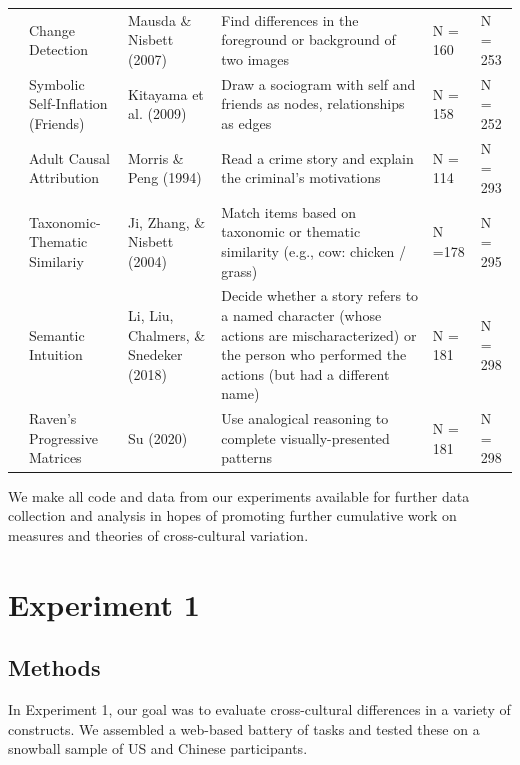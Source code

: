 \documentclass[
  man,floatsintext]{apa6}
\begin{document}
\begin{table}[H]
{\begin{tabular}{l p{1.5in} p{1.5in} p{1.5in} p{.5in} p{.5in}}
& Change Detection & Mausda \& Nisbett (2007) & Find differences in the foreground or background of two images & N = 160 & N = 253\\

& Symbolic Self-Inflation (Friends) & Kitayama et al. (2009) & Draw a sociogram with self and friends as nodes, relationships as edges & N = 158 & N = 252\\

& Adult Causal Attribution & Morris \& Peng (1994) & Read a crime story and explain the criminal’s motivations & N = 114 & N = 293\\

& Taxonomic-Thematic Similariy & Ji, Zhang, \& Nisbett (2004) & Match items based on taxonomic or thematic similarity (e.g., cow: chicken / grass) & N =178 & N = 295\\

& Semantic Intuition & Li, Liu, Chalmers, \& Snedeker (2018) & Decide whether a story refers to a named character (whose actions are mischaracterized) or the person who performed the actions (but had a different name) & N = 181 & N = 298\\

& Raven's Progressive Matrices & Su (2020) & Use analogical reasoning to complete visually-presented patterns & N = 181 & N = 298\\
    \hline
    \end{tabular}}

\end{table}

We make all code and data from our experiments available for further data collection and analysis in hopes of promoting further cumulative work on measures and theories of cross-cultural variation.

\hypertarget{experiment-1}{%
\section{Experiment 1}\label{experiment-1}}

\hypertarget{methods}{%
\subsection{Methods}\label{methods}}

In Experiment 1, our goal was to evaluate cross-cultural differences in a variety of constructs. We assembled a web-based battery of tasks and tested these on a snowball sample of US and Chinese participants.
\end{document}
